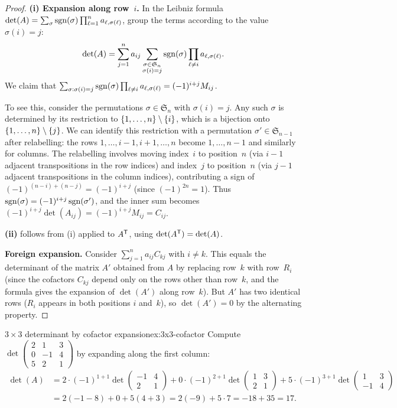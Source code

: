 \begin{proof}
\textbf{(i) Expansion along row~$i$.}
In the Leibniz formula $\det(A)=\sum_{\sigma}\operatorname{sgn}(\sigma)
\prod_{\ell=1}^n a_{\ell,\sigma(\ell)}$, group the terms according
to the value $\sigma(i)=j$:
\[
  \det(A) = \sum_{j=1}^n a_{ij}
    \sum_{\substack{\sigma\in\mathfrak{S}_n\\\sigma(i)=j}}
    \operatorname{sgn}(\sigma)\prod_{\ell\neq i}a_{\ell,\sigma(\ell)}.
\]
We claim that
$\sum_{\sigma:\sigma(i)=j}\operatorname{sgn}(\sigma)\prod_{\ell\neq i}
a_{\ell,\sigma(\ell)} = (-1)^{i+j}M_{ij}$.

To see this, consider the permutations $\sigma\in\mathfrak{S}_n$
with $\sigma(i)=j$. Any such $\sigma$ is determined by its restriction
to $\left\{1,\ldots,n\right\}\setminus\left\{i\right\}$, which is a bijection onto
$\left\{1,\ldots,n\right\}\setminus\left\{j\right\}$. We can identify this restriction
with a permutation $\sigma'\in\mathfrak{S}_{n-1}$ after relabelling:
the rows $1,\ldots,i-1,i+1,\ldots,n$ become $1,\ldots,n-1$ and
similarly for columns. The relabelling involves moving index~$i$ to
position~$n$ (via $i-1$ adjacent transpositions in the row indices)
and index~$j$ to position~$n$ (via $j-1$ adjacent transpositions
in the column indices), contributing a sign of
$(-1)^{(n-i)+(n-j)}=(-1)^{i+j}$ (since $(-1)^{2n}=1$).
Thus $\operatorname{sgn}(\sigma) = (-1)^{i+j}\operatorname{sgn}(\sigma')$, and the inner sum
becomes $(-1)^{i+j}\det(A_{ij})=(-1)^{i+j}M_{ij}=C_{ij}$.

\textbf{(ii)} follows from (i) applied to ${A}^{\mathsf{T}}$, using
$\det({A}^{\mathsf{T}})=\det(A)$.

\textbf{Foreign expansion.}
Consider $\sum_{j=1}^n a_{ij}C_{kj}$ with $i\neq k$. This equals the
determinant of the matrix $A'$ obtained from $A$ by replacing row~$k$
with row~$R_i$ (since the cofactors $C_{kj}$ depend only on the rows
other than row~$k$, and the formula gives the expansion of $\det(A')$
along row~$k$). But $A'$ has two identical rows ($R_i$ appears in both
positions $i$ and~$k$), so $\det(A')=0$ by the alternating property.
\end{proof}

\begin{example}{$3\times 3$ determinant by cofactor expansion}{ex:3x3-cofactor}
Compute $\det\begin{pmatrix} 2 & 1 & 3 \\ 0 & -1 & 4 \\ 5 & 2 & 1
\end{pmatrix}$ by expanding along the first column:
\begin{align*}
  \det(A) &= 2\cdot(-1)^{1+1}\det\begin{pmatrix}-1&4\\2&1\end{pmatrix}
  + 0\cdot(-1)^{2+1}\det\begin{pmatrix}1&3\\2&1\end{pmatrix}
  + 5\cdot(-1)^{3+1}\det\begin{pmatrix}1&3\\-1&4\end{pmatrix}\\
  &= 2(-1-8) + 0 + 5(4+3) = 2(-9)+5\cdot 7 = -18+35 = 17.
\end{align*}
\end{example}


